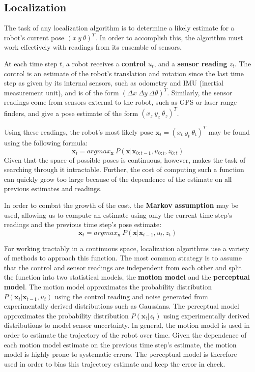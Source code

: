 \documentclass[letterpaper, 12 pt, conference]{ieeeconf}  %
\begin{document}
\subsection{Localization}
The task of any localization algorithm is to determine a likely estimate for a robot's current pose $(x~y~\theta)^T$. In order to accomplish this, the algorithm must work effectively with readings from its ensemble of sensors. 
\par
At each time step $t$, a robot receives a \textbf{control} $u_t$, and a \textbf{sensor reading} $z_t$. The control is an estimate of the robot's translation and rotation since the last time step as given by its internal sensors, such as odometry and IMU (inertial measurement unit), and is of the form $(\Delta x~\Delta y~\Delta \theta)^T$. Similarly, the sensor readings come from sensors external to the robot, such as GPS or laser range finders, and give a pose estimate of the form $(x_z~y_z~\theta _z)^T$. 
\par 
Using these readings, the robot's most likely pose $\textbf{x}_t=(x_t~y_t~\theta _t)^T$ may be found using the following formula: 
$$
\textbf{x}_t = argmax_{\textbf{x}}~P(\textbf{x}|\textbf{x}_{0:t-1}, u_{0:t}, z_{0:t})
$$
Given that the space of possible poses is continuous, however, makes the task of searching through it intractable. Further, the cost of computing such a function can quickly grow too large because of the dependence of the estimate on all previous estimates and readings. 
\par
In order to combat the growth of the cost, the \textbf{Markov assumption} may be used, allowing us to compute an estimate using only the current time step's readings and the previous time step's pose estimate:
$$
\textbf{x}_t = argmax_{\textbf{x}}~P(\textbf{x}|\textbf{x}_{t-1}, u_t, z_t)
$$
\par
For working tractably in a continuous space, localization algorithms use a variety of methods to approach this function. The most common strategy is to assume that the control and sensor readings are independent from each other and split the function into two statistical models, the \textbf{motion model} and the \textbf{perceptual model}. The motion model approximates the probability distribution $P(\textbf{x}_t|\textbf{x}_{t-1},u_t)$ using the control reading and noise generated from experimentally derived distributions such as Gaussians. The perceptual model approximates the probability distribution $P(\textbf{x}_t|z_t)$ using experimentally derived distributions to model sensor uncertainty. In general, the motion model is used in order to estimate the trajectory of the robot over time. Given the dependence of each motion model estimate on the previous time step's estimate, the motion model is highly prone to systematic errors. The perceptual model is therefore used in order to bias this trajectory estimate and keep the error in check. 
\end{document}
